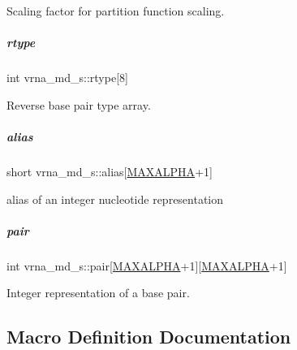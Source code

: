 Scaling factor for partition function scaling. 

\mbox{\label{group__model__details_ad082d0fea31e002b90cdfe5e6382f8b0}} 
\subparagraph{\texorpdfstring{rtype}{rtype}}
{\footnotesize\ttfamily int vrna\+\_\+md\+\_\+s\+::rtype\mbox{[}8\mbox{]}}



Reverse base pair type array. 

\mbox{\label{group__model__details_a66136cf9abc8ff790ec0d33245d68fd5}} 
\subparagraph{\texorpdfstring{alias}{alias}}
{\footnotesize\ttfamily short vrna\+\_\+md\+\_\+s\+::alias\mbox{[}\mbox{\hyperlink{pair__mat_8h_a05a5ffe718aa431d97419a12fb082379}{M\+A\+X\+A\+L\+P\+HA}}+1\mbox{]}}



alias of an integer nucleotide representation 

\mbox{\label{group__model__details_ab4da594c638707e212f64aadb54a7454}} 
\subparagraph{\texorpdfstring{pair}{pair}}
{\footnotesize\ttfamily int vrna\+\_\+md\+\_\+s\+::pair\mbox{[}\mbox{\hyperlink{pair__mat_8h_a05a5ffe718aa431d97419a12fb082379}{M\+A\+X\+A\+L\+P\+HA}}+1\mbox{]}\mbox{[}\mbox{\hyperlink{pair__mat_8h_a05a5ffe718aa431d97419a12fb082379}{M\+A\+X\+A\+L\+P\+HA}}+1\mbox{]}}



Integer representation of a base pair. 



\subsection{Macro Definition Documentation}
\mbox{\label{group__model__details_gad554b4852cd5fec35025db8edbbba3cd}} 
